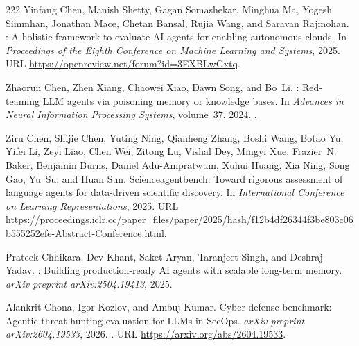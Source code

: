 \begin{thebibliography}{222}
Yinfang Chen, Manish Shetty, Gagan Somashekar, Minghua Ma, Yogesh Simmhan,
  Jonathan Mace, Chetan Bansal, Rujia Wang, and Saravan Rajmohan.
: A holistic framework to evaluate {AI} agents for enabling
  autonomous clouds.
\newblock In \emph{Proceedings of the Eighth Conference on Machine Learning and
  Systems}, 2025{}.
\newblock URL \url{https://openreview.net/forum?id=3EXBLwGxtq}.

Zhaorun Chen, Zhen Xiang, Chaowei Xiao, Dawn Song, and Bo~Li.
: Red-teaming {LLM} agents via poisoning memory or
  knowledge bases.
\newblock In \emph{Advances in Neural Information Processing Systems},
  volume~37, 2024.
\newblock {}.

Ziru Chen, Shijie Chen, Yuting Ning, Qianheng Zhang, Boshi Wang, Botao Yu,
  Yifei Li, Zeyi Liao, Chen Wei, Zitong Lu, Vishal Dey, Mingyi Xue, Frazier~N.
  Baker, Benjamin Burns, Daniel Adu-Ampratwum, Xuhui Huang, Xia Ning, Song Gao,
  Yu~Su, and Huan Sun.
\newblock Scienceagentbench: Toward rigorous assessment of language agents for
  data-driven scientific discovery.
\newblock In \emph{International Conference on Learning Representations},
  2025{}.
\newblock URL
  \url{https://proceedings.iclr.cc/paper_files/paper/2025/hash/f12b4df26344f3be803c06b555252efe-Abstract-Conference.html}.

Prateek Chhikara, Dev Khant, Saket Aryan, Taranjeet Singh, and Deshraj Yadav.
: Building production-ready {AI} agents with scalable long-term
  memory.
\newblock \emph{arXiv preprint arXiv:2504.19413}, 2025.

Alankrit Chona, Igor Kozlov, and Ambuj Kumar.
\newblock Cyber defense benchmark: Agentic threat hunting evaluation for {LLM}s
  in {SecOps}.
\newblock \emph{arXiv preprint arXiv:2604.19533}, 2026.
\newblock {}.
\newblock URL \url{https://arxiv.org/abs/2604.19533}.


\end{thebibliography}

